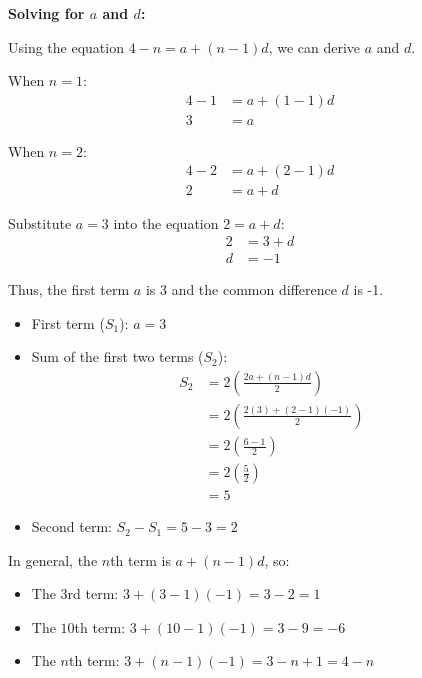 \documentclass[journal,12pt,onecolumn]{IEEEtran}
\theoremstyle{remark}
\begin{document}
\textbf{Solving for \(a\) and \(d\):}

Using the equation \(4 - n = a + (n-1)d\), we can derive \(a\) and \(d\).

When \(n = 1\):
\begin{align*}
4 - 1 &= a + (1-1)d \\
3 &= a
\end{align*}

When \(n = 2\):
\begin{align*}
4 - 2 &= a + (2-1)d \\
2 &= a + d
\end{align*}

Substitute \(a = 3\) into the equation \(2 = a + d\):
\begin{align*}
2 &= 3 + d \\
d &= -1
\end{align*}

Thus, the first term \(a\) is 3 and the common difference \(d\) is -1.

\begin{itemize}
    \item First term (\(S_1\)): \(a = 3\)
    \item Sum of the first two terms (\(S_2\)):
    \begin{align*}
    S_2 &= 2\left(\frac{2a + (n-1)d}{2}\right) \\
    &= 2\left(\frac{2(3) + (2-1)(-1)}{2}\right) \\
    &= 2\left(\frac{6 - 1}{2}\right) \\
    &= 2\left(\frac{5}{2}\right) \\
    &= 5
    \end{align*}
    \item Second term: \(S_2 - S_1 = 5 - 3 = 2\)
\end{itemize}

In general, the \(n\)th term is \(a + (n-1)d\), so:
\begin{itemize}
    \item The \(3\)rd term: \(3 + (3-1)(-1) = 3 - 2 = 1\)
    \item The \(10\)th term: \(3 + (10-1)(-1) = 3 - 9 = -6\)
    \item The \(n\)th term: \(3 + (n-1)(-1) = 3 - n + 1 = 4 - n\)
\end{itemize}
\end{document}

